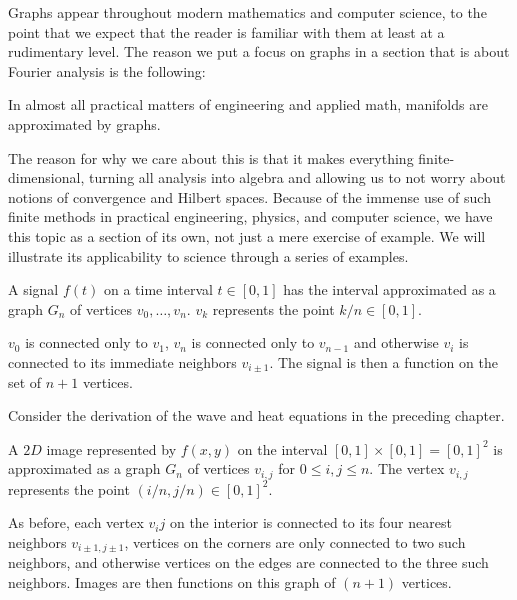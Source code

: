 	Graphs appear throughout modern mathematics and computer science, to the point that we expect that the reader is familiar with them at least at a rudimentary level. The reason we put a focus on graphs in a section that is about Fourier analysis is the following:
	\begin{concept}
		In almost all practical matters of engineering and applied math, manifolds are approximated by graphs. 
	\end{concept}
	The reason for why we care about this is that it makes everything finite-dimensional, turning all analysis into algebra and allowing us to not worry about notions of convergence and Hilbert spaces. Because of the immense use of such finite methods in practical engineering, physics, and computer science, we have this topic as a section of its own, not just a mere exercise of example. We will illustrate its applicability to science through a series of examples.
	\begin{example}
		A signal $f(t)$ on a time interval $t \in [0,1]$ has the interval approximated as a graph $G_n$ of vertices $v_0, \dots, v_n$. $v_k$ represents the point $k/n \in [0,1]$. 
		
		$v_0$ is connected only to $v_1$, $v_n$ is connected only to $v_{n-1}$ and otherwise $v_{i}$ is connected to its immediate neighbors $v_{i\pm1}$. The signal is then a function on the set of $n+1$ vertices. 
	\end{example}
	Consider the derivation of the wave and heat equations in the preceding chapter. 
	\begin{example}
		A $2D$ image represented by $f(x,y)$ on the interval $[0,1] \times [0,1] = [0,1]^2$ is approximated as a graph $G_n$ of vertices $v_{i,j}$ for $0\leq i, j \leq n$. The vertex $v_{i,j}$ represents the point $(i/n, j/n) \in [0,1]^2$. 
		
		As before, each vertex $v_ij$ on the interior is connected to its four nearest neighbors $v_{i\pm 1, j\pm1}$, vertices on the corners are only connected to two such neighbors, and otherwise vertices on the edges are connected to the three such neighbors. Images are then functions on this graph of $(n+1)$ vertices. 
	\end{example}
	
